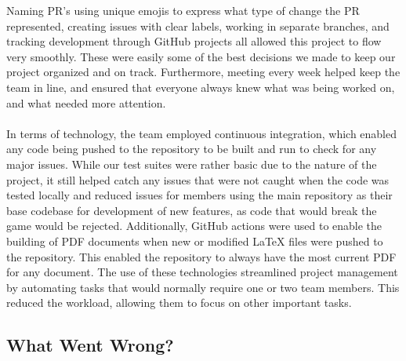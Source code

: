 \documentclass{article}
\begin{document}
Naming PR's using unique emojis to express what type of change the PR represented, creating issues with clear labels, working in separate branches, and tracking development through GitHub projects all allowed this project to flow very smoothly. These were easily some of the best decisions we made to keep our project organized and on track. Furthermore, meeting every week helped keep the team in line, and ensured that everyone always knew what was being worked on, and what needed more attention.
\\
\\
In terms of technology, the team employed continuous integration, which enabled any code being pushed to the repository to be built and run to check for any major issues. While our test suites were rather basic due to the nature of the project, it still helped catch any issues that were not caught when the code was tested locally and reduced issues for members using the main repository as their base codebase for development of new features, as code that would break the game would be rejected. Additionally, GitHub actions were used to enable the building of PDF documents when new or modified LaTeX files were pushed to the repository. This enabled the repository to always have the most current PDF for any document. The use of these technologies streamlined project management by automating tasks that would normally require one or two team members. This reduced the workload, allowing them to focus on other important tasks.

\subsection{What Went Wrong?}
\end{document}
